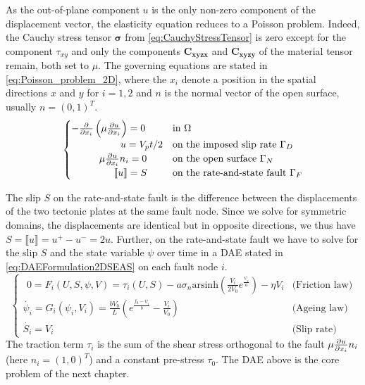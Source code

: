As the out-of-plane component $u$ is the only non-zero component of the displacement vector, the elasticity equation reduces to a Poisson problem. Indeed, the Cauchy stress tensor $\mathbf{\sigma}$ from \autoref{eq:CauchyStressTensor} is zero except for the component $\tau_{xy}$ and only the components $\mathbf{C_{xyzx}}$ and $\mathbf{C_{xyzy}}$ of the material tensor remain, both set to $\mu$. The governing equations are stated in \autoref{eq:Poisson_problem_2D}, where the $x_i$ denote a position in the spatial directions $x$ and $y$ for $i=1,2$ and $n$ is the normal vector of the open surface, usually  $n=(0,1)^T$.
\begin{equation}
	\label{eq:Poisson_problem_2D}
	\begin{cases}
		-\pdv{}{x_i}\left(\mu\pdv{u}{x_i}\right) = 0 & \text{in } \Omega \\
		\qquad\qquad\quad  u = V_pt/2 & \text{on the imposed slip rate } \Gamma_D \\
		\qquad\ \ \, \mu\pdv{u}{x_i}n_i = 0 & \text{on the open surface } \Gamma_N \\
		\qquad\qquad\  \llbracket u \rrbracket = S  & \text{on the rate-and-state fault } \Gamma_F
	\end{cases}
\end{equation}

The slip $S$ on the rate-and-state fault is the difference between the displacements of the two tectonic plates at the same fault node. Since we solve for symmetric domains, the displacements are identical but in opposite directions, we thus have $S = \llbracket u \rrbracket = u^+ - u^- = 2u$. Further, on the rate-and-state fault we have to solve for the slip $S$ and the state variable $\psi$ over time in a DAE stated in \autoref{eq:DAEFormulation2DSEAS} on each fault node $i$. 
\begin{equation}
	\label{eq:DAEFormulation2DSEAS}
	\begin{cases}
		\,\  0 = F_i(U,S,\psi,V) = \tau_i(U,S) - a\sigma_n\text{arsinh}\left(\frac{V_i}{2V_0}e^{\frac{\psi_i}{a}}\right) -\eta V_i & \text{(Friction law)}\\
		\dot{\psi_i} = G_i(\psi_i, V_i) =\frac{bV_0}{L}\left(e^{\frac{f_0-\psi_i}{b}} - \frac{V_i}{V_0}\right) & \text{(Ageing law)} \\
    	\dot{S_i} = V_i & \text{(Slip rate)}
	\end{cases}
\end{equation} 
The traction term $\tau_i$  is the sum of the shear stress orthogonal to the fault $\mu\pdv{u}{x_i}n_i$ (here $n_i = (1,0)^T$) and a constant pre-stress $\tau_0$. The DAE above is the core problem of the next chapter. 

